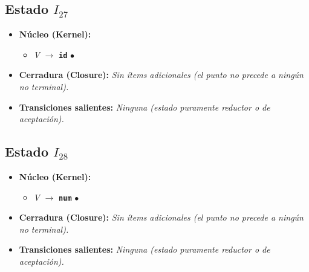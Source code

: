 \documentclass[12pt, letterpaper]{article}
\begin{document}
\subsection*{Estado $I_{27}$ }
\begin{itemize}\setlength{\itemsep}{1pt}\setlength{\parskip}{0pt}
\item \textbf{Núcleo (Kernel):}
\begin{itemize}\setlength{\itemsep}{1pt}\setlength{\parskip}{0pt}
    \item \textit{V} $\to$ \textbf{\texttt{id}} $\bullet$ 
\end{itemize}
\item \textbf{Cerradura (Closure):} \emph{Sin ítems adicionales (el punto no precede a ningún no terminal).}
\item \textbf{Transiciones salientes:} \emph{Ninguna (estado puramente reductor o de aceptación).}
\end{itemize}
\vspace{2pt}
\subsection*{Estado $I_{28}$ }
\begin{itemize}\setlength{\itemsep}{1pt}\setlength{\parskip}{0pt}
\item \textbf{Núcleo (Kernel):}
\begin{itemize}\setlength{\itemsep}{1pt}\setlength{\parskip}{0pt}
    \item \textit{V} $\to$ \textbf{\texttt{num}} $\bullet$ 
\end{itemize}
\item \textbf{Cerradura (Closure):} \emph{Sin ítems adicionales (el punto no precede a ningún no terminal).}
\item \textbf{Transiciones salientes:} \emph{Ninguna (estado puramente reductor o de aceptación).}
\end{itemize}
\vspace{2pt}
\end{document}
